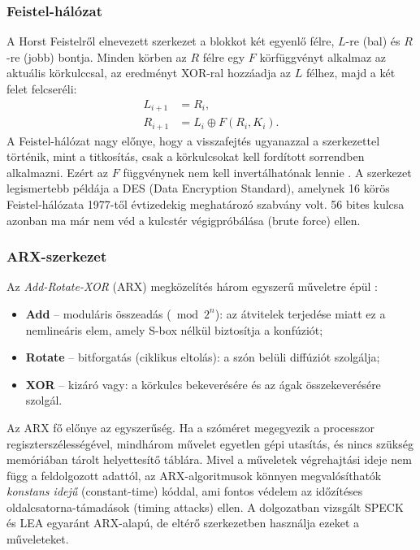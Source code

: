 \documentclass[a4paper,12pt]{report}
\theoremstyle{definition}
\theoremstyle{remark}
\begin{document}
\subsubsection{Feistel-hálózat}

A Horst Feistelről elnevezett szerkezet a blokkot két egyenlő félre, $L$-re (bal) és $R$-re (jobb) bontja. Minden körben az $R$ félre egy $F$ körfüggvényt alkalmaz az aktuális körkulccsal, az eredményt XOR-ral hozzáadja az $L$ félhez, majd a két felet felcseréli:
\begin{align}
	L_{i+1} &= R_i, \nonumber\\
	R_{i+1} &= L_i \oplus F(R_i, K_i).
\end{align}
A Feistel-hálózat nagy előnye, hogy a visszafejtés ugyanazzal a szerkezettel történik, mint a titkosítás, csak a körkulcsokat kell fordított sorrendben alkalmazni. Ezért az $F$ függvénynek nem kell invertálhatónak lennie \cite{Paar2010}. A szerkezet legismertebb példája a DES (Data Encryption Standard), amelynek 16 körös Feistel-hálózata 1977-től évtizedekig meghatározó szabvány volt. 56 bites kulcsa azonban ma már nem véd a kulcstér végigpróbálása (brute force) ellen.

\subsubsection{ARX-szerkezet}

Az \emph{Add-Rotate-XOR} (ARX) megközelítés három egyszerű műveletre épül \cite{Beaulieu2013}:

\begin{itemize}
	\item \textbf{Add} -- moduláris összeadás ($\bmod 2^n$): az átvitelek terjedése miatt ez a nemlineáris elem, amely S-box nélkül biztosítja a konfúziót;
	\item \textbf{Rotate} -- bitforgatás (ciklikus eltolás): a szón belüli diffúziót szolgálja;
	\item \textbf{XOR} -- kizáró vagy: a körkulcs bekeverésére és az ágak összekeverésére szolgál.
\end{itemize}

Az ARX fő előnye az egyszerűség. Ha a szóméret megegyezik a processzor regiszterszélességével, mindhárom művelet egyetlen gépi utasítás, és nincs szükség memóriában tárolt helyettesítő táblára. Mivel a műveletek végrehajtási ideje nem függ a feldolgozott adattól, az ARX-algoritmusok könnyen megvalósíthatók \emph{konstans idejű} (constant-time) kóddal, ami fontos védelem az időzítéses oldalcsatorna-támadások (timing attacks) ellen. A dolgozatban vizsgált SPECK és LEA egyaránt ARX-alapú, de eltérő szerkezetben használja ezeket a műveleteket.
\end{document}
